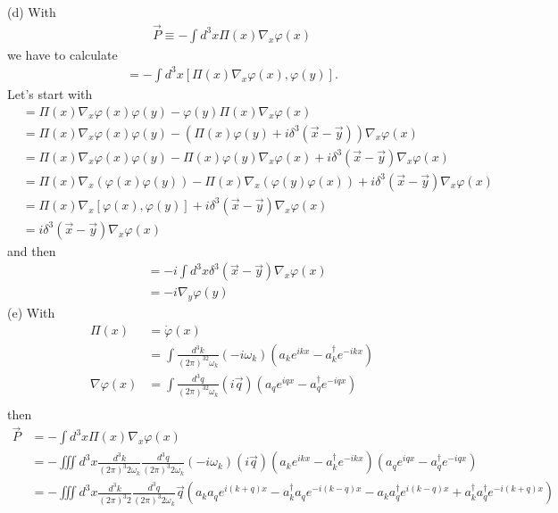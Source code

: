 \documentclass[10pt,a4paper]{article}
\theoremstyle{definition}
\begin{document}
(d) With
\begin{align}
\vec{P}\equiv-\int d^3x\Pi(x)\nabla_x\varphi(x)
\end{align}
we have to calculate
\begin{align}
[\vec{P},\varphi(y)]=-\int d^3x[\Pi(x)\nabla_x\varphi(x),\varphi(y)].
\end{align}
Let's start with
\begin{align}
[\Pi(x)\nabla_x\varphi(x),\varphi(y)]
&=\Pi(x)\nabla_x\varphi(x)\varphi(y)-\varphi(y)\Pi(x)\nabla_x\varphi(x)\\
&=\Pi(x)\nabla_x\varphi(x)\varphi(y)-(\Pi(x)\varphi(y)+i\delta^3(\vec{x}-\vec{y}))\nabla_x\varphi(x)\\
&=\Pi(x)\nabla_x\varphi(x)\varphi(y)-\Pi(x)\varphi(y)\nabla_x\varphi(x)+i\delta^3(\vec{x}-\vec{y})\nabla_x\varphi(x)\\
&=\Pi(x)\nabla_x(\varphi(x)\varphi(y))-\Pi(x)\nabla_x(\varphi(y)\varphi(x))+i\delta^3(\vec{x}-\vec{y})\nabla_x\varphi(x)\\
&=\Pi(x)\nabla_x[\varphi(x),\varphi(y)]+i\delta^3(\vec{x}-\vec{y})\nabla_x\varphi(x)\\
&=i\delta^3(\vec{x}-\vec{y})\nabla_x\varphi(x)
\end{align}
and then
\begin{align}
[\vec{P},\varphi(y)]
&=-i\int d^3x\delta^3(\vec{x}-\vec{y})\nabla_x\varphi(x)\\
&=-i\nabla_y\varphi(y)
\end{align}
(e) With
\begin{align}
\Pi(x)&=
\dot\varphi(x)\\
&=\int\frac{d^3k}{(2\pi)^32\omega_k}(-i\omega_k)(a_ke^{ikx}-a^\dagger_ke^{-ikx})\\
\nabla\varphi(x)
&=\int\frac{d^3q}{(2\pi)^32\omega_k}(i\vec{q})(a_qe^{iqx}-a^\dagger_qe^{-iqx})\\
\end{align}
then
\begin{align}
\vec{P}
&=-\int d^3x\Pi(x)\nabla_x\varphi(x)\\
&=-\iiint d^3x
\frac{d^3k}{(2\pi)^3 2\omega_k}
\frac{d^3q}{(2\pi)^3 2\omega_k}
(-i\omega_k)(i\vec{q})
(a_ke^{ikx}-a^\dagger_ke^{-ikx})
(a_qe^{iqx}-a^\dagger_qe^{-iqx})\\
&=-\iiint d^3x
\frac{d^3k}{(2\pi)^3 2}
\frac{d^3q}{(2\pi)^3 2\omega_k}\vec{q}
(a_ka_qe^{i(k+q)x}-a^\dagger_ka_qe^{-i(k-q)x}-
a_ka^\dagger_q e^{i(k-q)x}+a^\dagger_ka^\dagger_qe^{-i(k+q)x})\\
\end{align}
\end{document}
